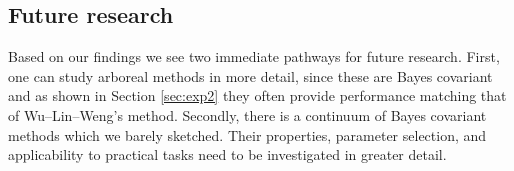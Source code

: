\subsection{Future research}

Based on our findings we see two immediate pathways for future research. 
First, one can study arboreal methods in more detail, since these are Bayes covariant 
and as shown in Section \ref{sec:exp2} they often provide performance matching 
that of Wu--Lin--Weng's method. Secondly, there is a continuum of Bayes covariant 
methods which we barely sketched. Their properties, parameter selection,  
and applicability to practical tasks need to be investigated in greater detail.



%
%
%
%
%
